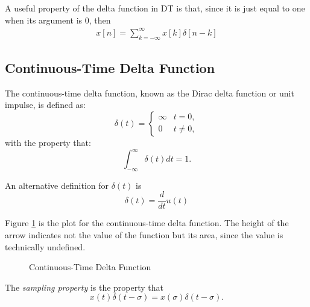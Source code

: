 A useful property of the delta function in DT is that, since
it is just equal to one when its argument is 0, then
\begin{eqnarray}
    x[n] = \sum_{k=-\infty}^{\infty} x[k]\delta [n-k]
\end{eqnarray}

\subsection{Continuous-Time Delta Function}
The continuous-time delta function, known as the Dirac delta
function or unit impulse, is defined as:
\[
    \delta(t) = \begin{cases}
        \infty & t = 0,    \\
        0      & t \neq 0,
    \end{cases}
\]
with the property that:
\[
    \int_{-\infty}^{\infty} \delta(t) dt = 1.
\]

An alternative definition for $\delta(t)$ is
\begin{equation}
    \delta(t) = \frac{d}{dt} u(t)
\end{equation}

Figure \ref{fig:ct delta} is the plot for the continuous-time delta function.
The height of the arrow indicates not the value of the function but its area,
since the value is technically undefined.
\begin{figure}[h!]
    \centering
    \caption{Continuous-Time Delta Function}
    \label{fig:ct delta}
\end{figure}

The \emph{sampling property} is the property that
\begin{equation}
    x(t) \delta(t - \sigma) = x(\sigma) \delta(t - \sigma).
\end{equation}

